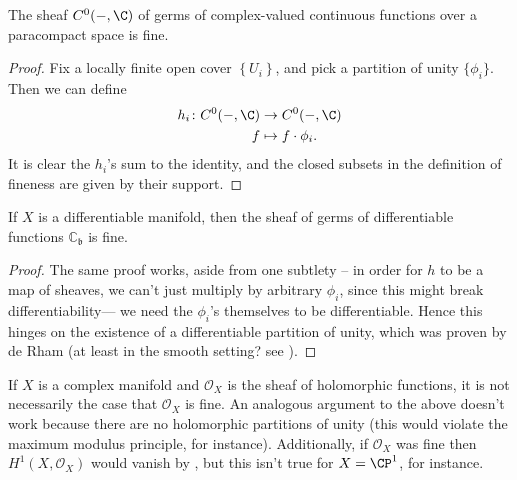 \documentclass[11pt]{book}
\begin{document}


\begin{example}\label{exa:cx-valued-cts-funcs-is-fine} 
The sheaf $C^0(-,\C)$ of germs of complex-valued continuous functions over a paracompact space is fine.
\end{example}
\begin{proof} Fix a locally finite open cover $\left\{ U_i \right\}$, and pick a partition of unity $\{\phi_i\}$. Then we can define
\begin{align*}
    h_i \colon C^0(-,\C) &\to C^0(-,\C) \\
    f &\mapsto f\cdot \phi_i.
\end{align*}
It is clear the $h_i$'s sum to the identity, and the closed subsets in the definition of fineness are given by their support.
\end{proof}

\begin{example} If $X$ is a differentiable manifold, then the sheaf of germs of differentiable functions $\mathbb{C}_{\mathfrak{b}}$ is fine.
\end{example}
\begin{proof} The same proof works, aside from one subtlety -- in order for $h$ to be a map of sheaves, we can't just multiply by arbitrary $\phi_i$, since this might break differentiability--- we need the $\phi_i$'s themselves to be differentiable. Hence this hinges on the existence of a differentiable partition of unity, which was proven by de Rham (at least in the smooth setting? see \cite[I.2]{derhamDifferentiableManifolds1984}). 
\end{proof}

\begin{remark} If $X$ is a complex manifold and $\mathcal{O}_X$ is the sheaf of holomorphic functions, it is not necessarily the case that $\mathcal{O}_X$ is fine. An analogous argument to the above doesn't work because there are no holomorphic partitions of unity (this would violate the maximum modulus principle, for instance). Additionally, if $\mathcal{O}_X$ was fine then $H^1(X,\mathcal{O}_X)$ would vanish by , but this isn't true for $X=\CP^1$, for instance.
\end{remark}
\end{document}
